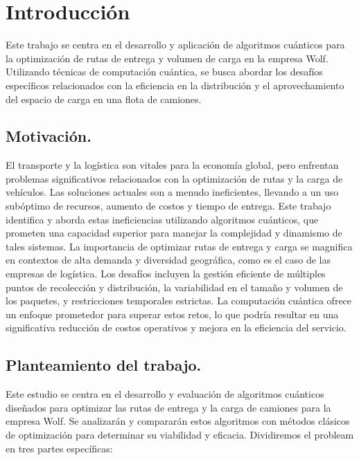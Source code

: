 \documentclass[11pt,a4paper,spanish]{book}
\begin{document}
\mainmatter
\chapter{Introducción}

Este trabajo se centra en el desarrollo y aplicación de algoritmos cuánticos para la optimización de rutas de entrega y volumen de carga en la empresa Wolf. Utilizando técnicas de computación cuántica, se busca abordar los desafíos específicos relacionados con la eficiencia en la distribución y el aprovechamiento del espacio de carga en una flota de camiones. 


\section{Motivación.}

    El transporte y la logística son vitales para la economía global, pero enfrentan problemas significativos relacionados con la optimización de rutas y la carga de vehículos. Las soluciones actuales son a menudo ineficientes, llevando a un uso subóptimo de recursos, aumento de costos y tiempo de entrega. Este trabajo identifica y aborda estas ineficiencias utilizando algoritmos cuánticos, que prometen una capacidad superior para manejar la complejidad y dinamismo de tales sistemas.
    La importancia de optimizar rutas de entrega y carga se magnifica en contextos de alta demanda y diversidad geográfica, como es el caso de las empresas de logística. Los desafíos incluyen la gestión eficiente de múltiples puntos de recolección y distribución, la variabilidad en el tamaño y volumen de los paquetes, y restricciones temporales estrictas. La computación cuántica ofrece un enfoque prometedor para superar estos retos, lo que podría resultar en una significativa reducción de costos operativos y mejora en la eficiencia del servicio.

\section{Planteamiento del trabajo.}

    Este estudio se centra en el desarrollo y evaluación de algoritmos cuánticos diseñados para optimizar las rutas de entrega y la carga de camiones para la empresa Wolf. Se analizarán y compararán estos algoritmos con métodos clásicos de optimización para determinar su viabilidad y eficacia. Dividiremos el probleam en tres partes específicas:
\end{document}
